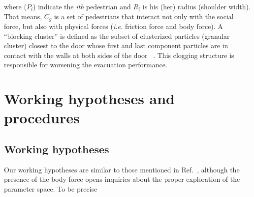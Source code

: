 \documentclass[preprint,12pt]{elsarticle}
\begin{document}
where ($P_i$) indicate the \textit{ith} pedestrian and $R_i$ is his (her) radius
(shoulder width). That means, $C_g$ is a set of pedestrians that interact not
only with the social force, but also with physical forces (\textit{i.e.}
friction force and body force). A ``blocking cluster'' is defined as the subset
of clusterized particles (granular cluster) closest to the door whose first  and
last component particles are in contact with the walls at both sides of the door
~\cite{dorso_2005}. This clogging structure is responsible for worsening the
evacuation performance.


\section{\label{hypotheses}Working hypotheses and procedures}


\subsection{Working hypotheses}

Our working hypotheses are similar to those mentioned in
Ref.~\cite{dorso_2019},  although the presence of the body force opens inquiries
about the proper  exploration of the parameter space. To be precise
\end{document}
